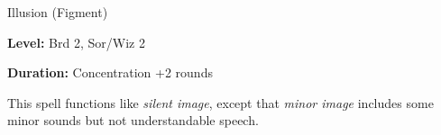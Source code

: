 
Illusion (Figment)

\textbf{Level:} Brd 2, Sor/Wiz 2

\textbf{Duration:} Concentration +2 rounds

This spell functions like \textit{silent image}, except that \textit{minor image 
}includes some minor sounds but not understandable speech.

